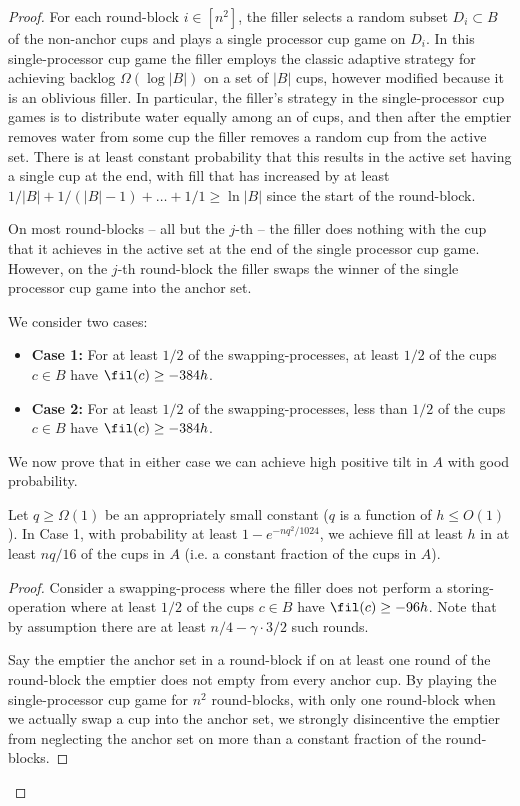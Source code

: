 \begin{proof}
For each round-block $i \in [n^2]$, the filler selects a random subset $D_i\subset
B$ of the non-anchor cups and plays a single processor cup game on $D_i$. In this
single-processor cup game the filler employs the classic adaptive strategy for
achieving backlog $\Omega(\log |B|)$ on a set of $|B|$ cups, however modified
because it is an oblivious filler. In particular, the filler's strategy in the
single-processor cup games is to distribute water equally among an  of cups, and then after the emptier removes water from some cup the filler
removes a random cup from the active set. There is at least constant
probability that this results in the active set having a single cup at the end,
with fill that has increased by at least $1/|B| + 1/(|B|-1) + \ldots + 1/1 \ge
\ln |B|$ since the start of the round-block.

On most round-blocks -- all but the $j$-th -- the filler does nothing with the
cup that it achieves in the active set at the end of the single processor cup
game. However, on the $j$-th round-block the filler swaps the winner of the
single processor cup game into the anchor set.

We consider two cases:
\begin{itemize}
  \item \textbf{Case 1:} For at least $1/2$ of the swapping-processes, at
    least $1/2$ of the cups $c \in B$ have $\fil(c) \ge -384h$.
  \item \textbf{Case 2:} For at least $1/2$ of the swapping-processes, less
    than $1/2$ of the cups $c \in B$ have $\fil(c) \ge -384h$.
\end{itemize}
We now prove that in either case we can achieve high positive tilt in $A$ with
good probability.

\begin{clm} \label{clm:reg} 
  Let $q\ge \Omega(1)$ be an appropriately small constant ($q$ is a function of
  $h\le O(1)$). In Case 1, with probability at least $1-e^{-nq^2/1024}$, we
  achieve fill at least $h$ in at least $nq/16$ of the cups in $A$ (i.e. a
  constant fraction of the cups in $A$). 
\end{clm}
\begin{proof}
  Consider a swapping-process where the filler does not perform a
  storing-operation where at least $1/2$ of the cups $c \in B$ have $\fil(c)
  \ge -96h$. Note that by assumption there are at least $n/4 - \gamma\cdot 3/2$ such rounds.
 
  Say the emptier  the anchor set in a round-block if on at
  least one round of the round-block the emptier does not empty from every
  anchor cup. By playing the single-processor cup game for $n^2$ round-blocks,
  with only one round-block when we actually swap a cup into the anchor set, we
  strongly disincentive the emptier from neglecting the anchor set on more
  than a constant fraction of the round-blocks. 


\end{proof}
\end{proof}
